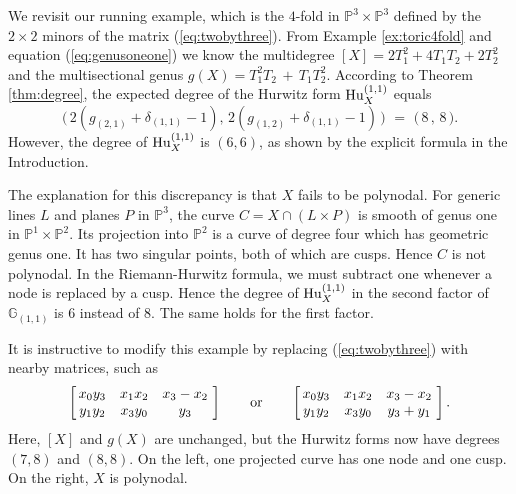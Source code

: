 \documentclass[12pt]{article}
\theoremstyle{definition}
\newenvironment{example}
{\pushQED{\qed}\renewcommand{\qedsymbol}{$\diamond$}\examplex}
{\popQED\endexamplex}
\newcommand{\bG}{\mathbb G}
\newcommand{\bP}{\mathbb P}
\begin{document}
\begin{example}[Toric $4$-fold] \label{ex:from88to66}
We revisit our running example,
which is the $4$-fold in $\bP^3 \times \bP^3$ defined by the
$2\times 2$ minors of the matrix (\ref{eq:twobythree}).
From Example \ref{ex:toric4fold} and equation (\ref{eq:genusoneone}) we know
the multidegree 
 $[X] =  2 T_1^2 + 4 T_1 T_2 + 2 T_2^2$
and  the multisectional genus $ g(X)  =   T_1^2 T_2 \,+\, T_1 T_2^2$.
According to Theorem \ref{thm:degree}, the expected degree of the
Hurwitz form ${\rm Hu}_X^{(1,1)}$ equals
\begin{equation}
\label{eq:expected88}
 \bigl( \,2( g_{(2,1)} + \delta_{(1,1)} - 1),  \,2(g_{(1,2)} + \delta_{(1,1)} - 1)\, \bigr) \,\, =\,\, \bigr(\, 8\,,\,8\, \bigr). 
 \end{equation}
However, the degree of  ${\rm Hu}_X^{(1,1)}$ is $(6,6)$, as shown by the explicit formula in the Introduction.

The explanation for this discrepancy is that $X$ fails to be polynodal.
For generic lines $L$ and planes $P$ in $\bP^3$, the curve
$C = X \cap (L \times P)$ is smooth of genus one in $\bP^1 \times \bP^2$.
Its projection into $\bP^2$ is a curve of degree four
which has geometric genus one. It has two singular points, both of which are
cusps. Hence $C$ is not polynodal.
 In the Riemann-Hurwitz formula, we must subtract one
whenever a node is replaced by a cusp. Hence the degree of ${\rm Hu}_X^{(1,1)}$
in the second factor of $\bG_{(1,1)}$ is $6$ instead of $8$. The same
holds for the first factor. 

It is instructive to modify this example by replacing (\ref{eq:twobythree}) with nearby matrices, such as
$$ 
 \begin{bmatrix} \,x_0 y_3 & x_1 x_2 & x_3 -x_2 \,\,\\
\,y_1 y_2 & x_3 y_0 & y_3 \,\,\end{bmatrix}
 \qquad {\rm or} \qquad 
 \begin{bmatrix} \, x_0 y_3 & x_1 x_2 & x_3 -x_2\,\,\\
\,y_1 y_2 & x_3 y_0 & y_3+y_1 \,\,\end{bmatrix}.
$$
Here, $[X]$ and $g(X)$ are unchanged, but
the Hurwitz forms now have degrees $ (7,8)$ and $(8,8)$.
On the left, one projected curve
has one node and one cusp.
On the right, $X$ is polynodal. 
\end{example}
\end{document}
